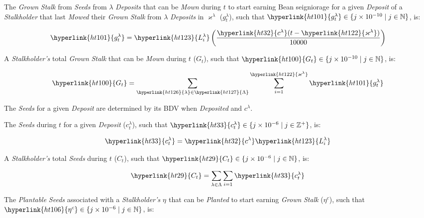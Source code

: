 \documentclass[tikz]{article}
\newcommand{\term}[1]{\textsl{#1}}
\newcommand{\bean}{} %
\begin{document}
The \term{Grown} \term{Stalk} from \term{Seeds} from \hyperlink{ht126}{$\lambda$} \term{Deposits} that can be \term{Mown} during \hyperlink{ht204}{$t$} to start earning Bean seigniorage for a given \term{Deposit} of a \term{Stalkholder} that last \term{Mowed} their \term{Grown} \term{Stalk} from \hyperlink{ht126}{$\lambda$} \term{Deposits} in \hyperlink{ht122}{$\varkappa^{\lambda}$} (\hyperlink{ht101}{$g_{t}^{\lambda}$}), such that $\hyperlink{ht101}{g_{t}^{\lambda}} \in \{j \times 10^{-10} \mid j \in \mathbb{N} \}$, is:

    $$
            \hyperlink{ht101}{g_{t}^{\lambda}} = 
                \hyperlink{ht123}{L_i^{\lambda}}\left
                    (\frac{\hyperlink{ht32}{c^{\lambda}}(t - \hyperlink{ht122}{\varkappa^{\lambda}})}
                        {10000}\right)
    $$

A \term{Stalkholder's} total \term{Grown} \term{Stalk} that can be \term{Mown} during \hyperlink{ht204}{$t$} (\hyperlink{ht100}{$G_t$}), such that $\hyperlink{ht100}{G_t} \in \{j \times 10^{-10} \mid j \in \mathbb{N} \}$, is:

    $$
        \hyperlink{ht100}{G_t} = 
            \sum_{\hyperlink{ht126}{\lambda} \in \hyperlink{ht127}{\Lambda}} 
                \sum_{i=1}^{\hyperlink{ht122}{\varkappa^{\lambda}}} 
                    \hyperlink{ht101}{g_{t}^{\lambda}}
    $$

The \term{Seeds} for a given \term{Deposit} are determined by its BDV when \term{Deposited} and \hyperlink{ht32}{$c^{\lambda}$}.

The \term{Seeds} during \hyperlink{ht204}{$t$} for a given \term{Deposit} (\hyperlink{ht33}{$c_{t}^{\lambda}$}), such that $\hyperlink{ht33}{c_{t}^{\lambda}} \in \{j \times 10^{-6} \mid j \in \mathbb{Z}^{+} \}$, is:

    $$
        \hyperlink{ht33}{c_{t}^{\lambda}} = \hyperlink{ht32}{c^{\lambda}} \hyperlink{ht123}{L_i^{\lambda}}
    $$
    
A \term{Stalkholder's} total \term{Seeds} during \hyperlink{ht204}{$t$} (\hyperlink{ht29}{$C_t$}), such that $\hyperlink{ht29}{C_t} \in \{j \times 10^{-6} \mid j \in \mathbb{N} \}$, is:

    $$
        \hyperlink{ht29}{C_t} = 
            \sum_{\lambda \in \Lambda} 
                \sum_{i=1} 
                    \hyperlink{ht33}{c_{t}^{\lambda}}
    $$
    
The \term{Plantable} \term{Seeds} associated with a \term{Stalkholder's} \hyperlink{ht105}{$\eta^{\bean}$} that can be \term{Planted} to start earning \term{Grown} \term{Stalk} (\hyperlink{ht106}{$\eta^{c}$}), such that $\hyperlink{ht106}{\eta^{c}} \in \{j \times 10^{-6} \mid j \in \mathbb{N} \}$, is:
\end{document}
